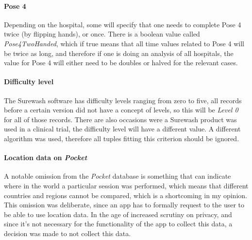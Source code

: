             \paragraph{Pose 4} Depending on the hospital, some will specify that one needs to complete Pose 4 twice (by flipping hands), or once. There is a boolean value called {\slshape Pose4TwoHanded}, which if true means that all time values related to Pose 4 will be twice as long, and therefore if one is doing an analysis of all hospitals, the value for Pose 4 will either need to be doubles or halved for the relevant cases.
            \paragraph{Difficulty level} The Surewash software has difficulty levels ranging from zero to five, all records before a certain version did not have a concept of levels, so this will be {\slshape Level 0} for all of those records. There are also occasions were a Surewash product was used in a clinical trial, the difficulty level will have a different value. A different algorithm was used, therefore all tuples fitting this criterion should be ignored.
            \paragraph{Location data on {\slshape Pocket}} A notable omission from the {\slshape Pocket} database is something that can indicate where in the world a particular session was performed, which means that different countries and regions cannot be compared, which is a shortcoming in my opinion. This omission was deliberate, since an app has to formally request to the user to be able to use location data. In the age of increased scrutiny on privacy, and since it's not necessary for the functionality of the app to collect this data, a decision was made to not collect this data.

